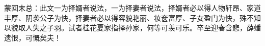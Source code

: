 \begin{parag}
    \begin{note}蒙回末总：此文一为择婿者说法，一为择妻者说法，择婿者必以得人物轩昂、家道丰厚、阴袭公子为快，择妻者必以得容貌艳丽、妆奁富厚、子女盈门为快，殊不知以貌取人失之子羽。试者桂花夏家指择孙家，何等可羡可乐。卒至迎春含悲，薛蟠遗恨，可慨矣夫！\end{note}
\end{parag}
